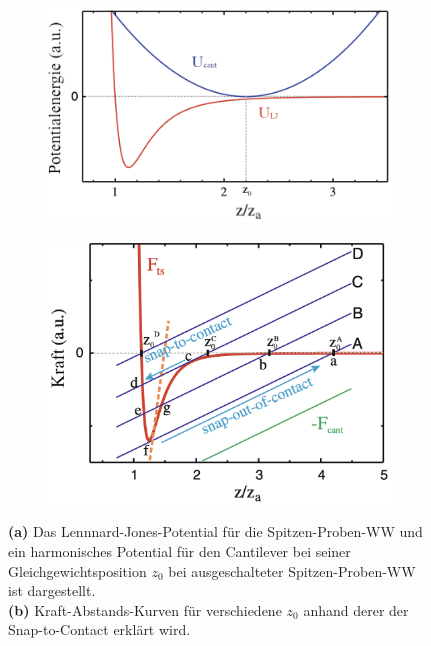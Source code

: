     \begin{figure}
        \centering
        \begin{subfigure}{0.49\textwidth}
            \includegraphics[width = \textwidth]{bilder/Snap_to_Contact_Potential.png}
            \caption{}
            \label{fig:Snap_to_Contact_Potential}
        \end{subfigure}
        \hfill
        \begin{subfigure}{0.49\textwidth}
            \includegraphics[width = \textwidth]{bilder/Snap_to_Contact_Kraft.png}
            \caption{}
            \label{fig:Snap_to_Contact_Kraft}
        \end{subfigure}
        \caption{\textbf{(a)} Das Lennnard-Jones-Potential für die Spitzen-Proben-WW und ein harmonisches Potential für den Cantilever bei seiner Gleichgewichtsposition $z_0$ bei ausgeschalteter Spitzen-Proben-WW ist dargestellt. \\ \textbf{(b)} Kraft-Abstands-Kurven für verschiedene $z_0$ anhand derer der Snap-to-Contact erklärt wird. \cite{voigtlaender}}
        \label{fig:Snap_to_Contact}
    \end{figure}
